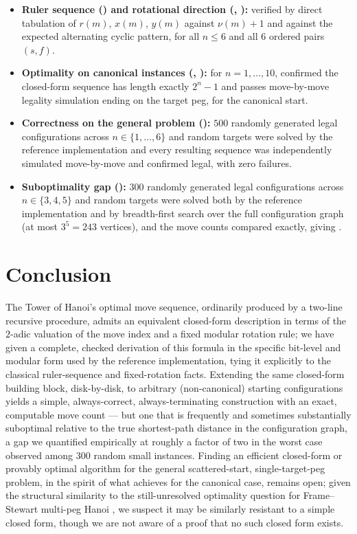 \documentclass[11pt]{article}
\begin{document}
\begin{itemize}[leftmargin=1.5em]
\item \textbf{Ruler sequence () and rotational direction
(, ):} verified by direct
tabulation of $r(m)$, $x(m)$, $y(m)$ against $\nu(m)+1$ and against the
expected alternating cyclic pattern, for all $n \le 6$ and all $6$ ordered
pairs $(s,f)$.
\item \textbf{Optimality on canonical instances (,
):} for $n = 1,\dots,10$, confirmed the closed-form
sequence has length exactly $2^n-1$ and passes move-by-move legality
simulation ending on the target peg, for the canonical start.
\item \textbf{Correctness on the general problem
():} $500$ randomly generated legal configurations
across $n \in \{1,\dots,6\}$ and random targets were solved by the
reference implementation and every resulting sequence was independently
simulated move-by-move and confirmed legal, with zero failures.
\item \textbf{Suboptimality gap ():} $300$ randomly
generated legal configurations across $n \in \{3,4,5\}$ and random targets
were solved both by the reference implementation and by breadth-first
search over the full configuration graph (at most $3^5 = 243$ vertices),
and the move counts compared exactly, giving .
\end{itemize}

\section{Conclusion}
\label{sec:conclusion}

The Tower of Hanoi's optimal move sequence, ordinarily produced by a
two-line recursive procedure, admits an equivalent closed-form description
in terms of the $2$-adic valuation of the move index and a fixed modular
rotation rule; we have given a complete, checked derivation of this
formula in the specific bit-level and modular form used by the reference
implementation, tying it explicitly to the classical ruler-sequence and
fixed-rotation facts. Extending the same closed-form building block,
disk-by-disk, to arbitrary (non-canonical) starting configurations yields a
simple, always-correct, always-terminating construction with an exact,
computable move count --- but one that is frequently and sometimes
substantially suboptimal relative to the true shortest-path distance in the
configuration graph, a gap we quantified empirically at roughly a factor of
two in the worst case observed among $300$ random small instances. Finding
an efficient closed-form or provably optimal algorithm for the general
scattered-start, single-target-peg problem, in the spirit of what
 achieves for the canonical case, remains open; given the
structural similarity to the still-unresolved optimality question for
Frame--Stewart multi-peg Hanoi \cite{frame1941,stewart1941,hinz2018}, we
suspect it may be similarly resistant to a simple closed form, though we
are not aware of a proof that no such closed form exists.
\end{document}

